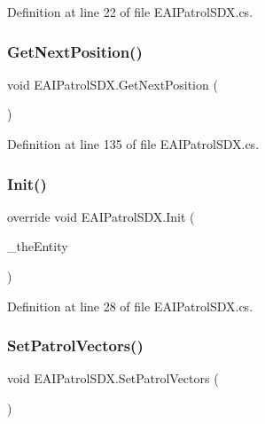 Definition at line 22 of file E\+A\+I\+Patrol\+S\+D\+X.\+cs.

\mbox{\label{class_e_a_i_patrol_s_d_x_a86fefa31acd885849b189ec650c86416}} 
\subsubsection{\texorpdfstring{GetNextPosition()}{GetNextPosition()}}
{\footnotesize\ttfamily void E\+A\+I\+Patrol\+S\+D\+X.\+Get\+Next\+Position (\begin{DoxyParamCaption}{ }\end{DoxyParamCaption})}



Definition at line 135 of file E\+A\+I\+Patrol\+S\+D\+X.\+cs.

\mbox{\label{class_e_a_i_patrol_s_d_x_a0b9c075e2bbbdeec6795454373e5f9ff}} 
\subsubsection{\texorpdfstring{Init()}{Init()}}
{\footnotesize\ttfamily override void E\+A\+I\+Patrol\+S\+D\+X.\+Init (\begin{DoxyParamCaption}\item[{Entity\+Alive}]{\+\_\+the\+Entity }\end{DoxyParamCaption})}



Definition at line 28 of file E\+A\+I\+Patrol\+S\+D\+X.\+cs.

\mbox{\label{class_e_a_i_patrol_s_d_x_a43dbbcac3d5d87e72ebd8e064ff18b0e}} 
\subsubsection{\texorpdfstring{SetPatrolVectors()}{SetPatrolVectors()}}
{\footnotesize\ttfamily void E\+A\+I\+Patrol\+S\+D\+X.\+Set\+Patrol\+Vectors (\begin{DoxyParamCaption}{ }\end{DoxyParamCaption})}



